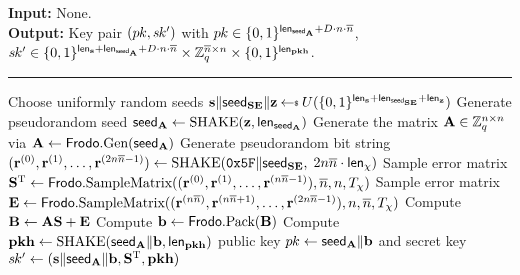 \documentclass{iacrcc}
\begin{document}
\begin{algorithm}[H]
\caption{\label{alg:KEM:KeyGen} $\FrodoKEM.\KeyGen$.}
{\bf Input:} None.\\
{\bf Output:} Key pair $(\pk, \sk')$ with $\pk \in \{0,1\}^{\lengthseedA + D\cdot n \cdot \nbar}$, $\sk' \in \{0,1\}^{\lengths + \lengthseedA + D\cdot n \cdot \nbar}\times \bbZ_q^{\nbar\times n} \times \{0,1\}^{\lengthpkhash}$.\\[-1.5ex]
\rule{\linewidth}{.5pt}
\vspace{-0.5cm}
\begin{algorithmic}[1]
    \STATE Choose uniformly random seeds $\bfs \| \seedSE\| \bfz \getsr U(\{0,1\}^{\lengths + \lengthseedSE + \lengthz})$
    \STATE Generate pseudorandom seed $\seedA \gets \SHAKE(\bfz, \lengthseedA)$
    \STATE Generate the matrix $\bfA \in \bbZ_q^{n \times n}$ via $\bfA\gets\Frodo.\gen(\seedA)$
    \STATE Generate pseudorandom bit string $ (\bfr^{(0)}, \bfr^{(1)}, \dots, \bfr^{(2n\nbar-1)}) \gets \SHAKE(\mathtt{0x5F} \| \seedSE,$ $2n\nbar \cdot \lengthchi)$
    \STATE Sample error matrix $\bfS^\text{T} \gets \Frodo.\SampV((\bfr^{(0)}, \bfr^{(1)}, \dots, \bfr^{(n\nbar-1)}), \nbar, n, T_\chi)$
    \STATE Sample error matrix $\bfE \gets \Frodo.\SampV((\bfr^{(n\nbar)}, \bfr^{(n\nbar+1)}, \dots, \bfr^{(2n\nbar-1)}), n, \nbar, T_\chi)$
    \STATE Compute $\bfB \gets \bfA\bfS + \bfE$
    \STATE Compute $\bfb \gets \Frodo.\Pack(\bfB)$
    \STATE Compute $\pkh \gets \SHAKE(\seedA\| \bfb, \lengthpkhash)$
    \RETURN public key $\pk \gets \seedA\| \bfb$ and secret key $\sk' \gets (\bfs \| \seedA \| \bfb, \bfS^\text{T}, \pkh)$
\end{algorithmic}
\end{algorithm}
\end{document}
